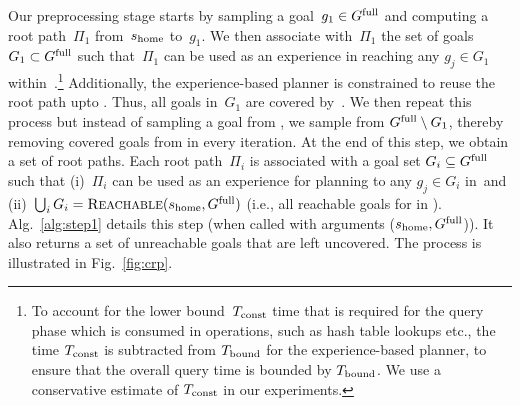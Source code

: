 \documentclass[a4paper]{report}
\begin{document}
Our preprocessing stage starts by sampling a goal~$g_1 \in G^{\textrm{full}}$ and computing a root path~$\Pi_1$ from~$s_{\textrm{home}}$ to~$g_1$. We then associate with~$\Pi_1$ the set of goals ~$G_1 \subset G^{\textrm{full}}$ such that~$\Pi_1$ can be used as an experience in reaching any $g_j \in G_1$ within~\Tbound.\footnote{To account for the lower bound~$T_{\textrm{const}}$ time that is required for the query phase which is consumed in operations, such as hash table lookups etc., the time $T_{\textrm{const}}$ is subtracted from $T_{\textrm{bound}}$ for the experience-based planner, to ensure that the overall query time is bounded by $T_{\textrm{bound}}$. We use a conservative estimate of $T_{\textrm{const}}$ in our experiments.}
Additionally, the experience-based planner is constrained to reuse the root path upto \Trc.
Thus, all goals in~$G_1$ are covered by~\Shome.
%
We then repeat this process but instead of sampling  a goal from \Gfull, we sample from $G^{\textrm{full}} \setminus G_1$, thereby removing covered goals from \Gfull in every iteration.
At the end of this step, we obtain a set of root paths. 
Each root path~$\Pi_i$ is associated with a goal set $G_i \subseteq G^{\textrm{full}}$ such that 
(i)~$\Pi_i$ can be used as an experience for planning to any $g_j \in G_i$ in~\Tbound and 
(ii)~$\bigcup_i G_i = \textsc{Reachable}(s_{\textrm{home}}, G^{\textrm{full}})$ (i.e., all reachable goals for \Shome in \Gfull).
%
Alg.~\ref{alg:step1} details this step (when called with arguments ($s_{\textrm{home}},G^{\textrm{full}}$)). It also returns a set of unreachable goals that are left uncovered.
The process is illustrated in Fig.~\ref{fig:crp}.
\end{document}
